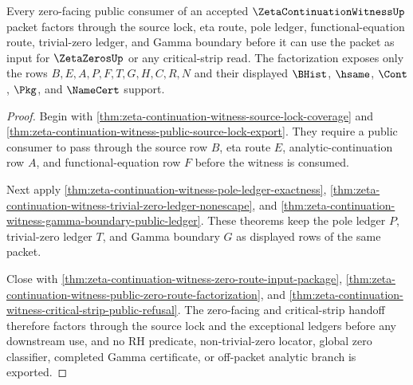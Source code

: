 \begin{theorem}
\label{thm:zeta-continuation-witness-zero-facing-public-factorization}
Every zero-facing public consumer of an accepted $\ZetaContinuationWitnessUp$ packet factors through the source lock, eta route, pole ledger, functional-equation route, trivial-zero ledger, and Gamma boundary before it can use the packet as input for $\ZetaZerosUp$ or any critical-strip read. The factorization exposes only the rows $B,E,A,P,F,T,G,H,C,R,N$ and their displayed $\BHist$, $\hsame$, $\Cont$, $\Pkg$, and $\NameCert$ support.
\end{theorem}
\begin{proof}
Begin with \autoref{thm:zeta-continuation-witness-source-lock-coverage} and \autoref{thm:zeta-continuation-witness-public-source-lock-export}. They require a public consumer to pass through the source row $B$, eta route $E$, analytic-continuation row $A$, and functional-equation row $F$ before the witness is consumed.

Next apply \autoref{thm:zeta-continuation-witness-pole-ledger-exactness}, \autoref{thm:zeta-continuation-witness-trivial-zero-ledger-nonescape}, and \autoref{thm:zeta-continuation-witness-gamma-boundary-public-ledger}. These theorems keep the pole ledger $P$, trivial-zero ledger $T$, and Gamma boundary $G$ as displayed rows of the same packet.

Close with \autoref{thm:zeta-continuation-witness-zero-route-input-package}, \autoref{thm:zeta-continuation-witness-public-zero-route-factorization}, and \autoref{thm:zeta-continuation-witness-critical-strip-public-refusal}. The zero-facing and critical-strip handoff therefore factors through the source lock and the exceptional ledgers before any downstream use, and no RH predicate, non-trivial-zero locator, global zero classifier, completed Gamma certificate, or off-packet analytic branch is exported.
\end{proof}

